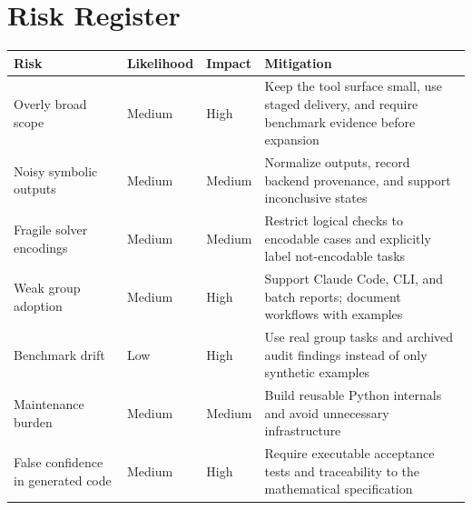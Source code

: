 \chapter{Risk Register}

\begin{longtable}{p{}p{}p{}p{}}
\toprule
\textbf{Risk} & \textbf{Likelihood} & \textbf{Impact} & \textbf{Mitigation} \\
\midrule
Overly broad scope & Medium & High & Keep the tool surface small, use staged delivery, and require benchmark evidence before expansion \\
Noisy symbolic outputs & Medium & Medium & Normalize outputs, record backend provenance, and support inconclusive states \\
Fragile solver encodings & Medium & Medium & Restrict logical checks to encodable cases and explicitly label not-encodable tasks \\
Weak group adoption & Medium & High & Support Claude Code, CLI, and batch reports; document workflows with examples \\
Benchmark drift & Low & High & Use real group tasks and archived audit findings instead of only synthetic examples \\
Maintenance burden & Medium & Medium & Build reusable Python internals and avoid unnecessary infrastructure \\
False confidence in generated code & Medium & High & Require executable acceptance tests and traceability to the mathematical specification \\
\bottomrule
\end{longtable}
